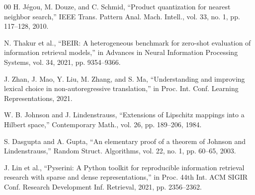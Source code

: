 \documentclass[conference,anonymous]{IEEEtran}
\begin{document}
\begin{thebibliography}{00}
 H. Jégou, M. Douze, and C. Schmid, ``Product quantization for nearest neighbor search,'' IEEE Trans. Pattern Anal. Mach. Intell., vol. 33, no. 1, pp. 117--128, 2010.

 N. Thakur et al., ``BEIR: A heterogeneous benchmark for zero-shot evaluation of information retrieval models,'' in Advances in Neural Information Processing Systems, vol. 34, 2021, pp. 9354--9366.

 J. Zhan, J. Mao, Y. Liu, M. Zhang, and S. Ma, ``Understanding and improving lexical choice in non-autoregressive translation,'' in Proc. Int. Conf. Learning Representations, 2021.

 W. B. Johnson and J. Lindenstrauss, ``Extensions of Lipschitz mappings into a Hilbert space,'' Contemporary Math., vol. 26, pp. 189--206, 1984.

 S. Dasgupta and A. Gupta, ``An elementary proof of a theorem of Johnson and Lindenstrauss,'' Random Struct. Algorithms, vol. 22, no. 1, pp. 60--65, 2003.

 J. Lin et al., ``Pyserini: A Python toolkit for reproducible information retrieval research with sparse and dense representations,'' in Proc. 44th Int. ACM SIGIR Conf. Research Development Inf. Retrieval, 2021, pp. 2356--2362.

\end{thebibliography}
\end{document}
